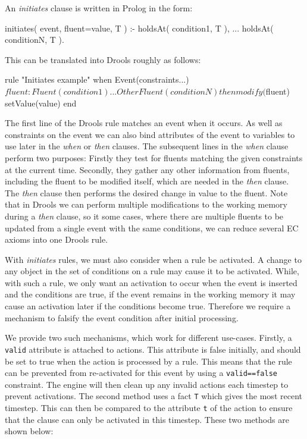 An \emph{initiates} clause is written in Prolog in the form:

\begin{prologinline}
initiates( event, fluent=value, T ) :-
	holdsAt( condition1, T ),
	...
	holdsAt( conditionN, T ).
\end{prologinline}

This can be translated into Drools roughly as follows:
\begin{droolsinline}
rule "Initiates example"
when
	Event(constraints...)
	$fluent : Fluent(condition1)
	...
	OtherFluent(conditionN)
then
	modify($fluent) {
		setValue(value)
	}
end
\end{droolsinline}

The first line of the Drools rule matches an event when it occurs. As well as
constraints on the event we can also bind attributes of the event to variables
to use later in the \emph{when} or \emph{then} clauses. The subsequent lines
in the \emph{when} clause perform two purposes: Firstly they test for fluents
matching the given constraints at the current time. Secondly, they gather any
other information from fluents, including the fluent to be modified itself,
which are needed in the \emph{then} clause. The \emph{then} clause then
performs the desired change in value to the fluent. Note that in Drools we can
perform multiple modifications to the working memory during a \emph{then}
clause, so it some cases, where there are multiple fluents to be updated from
a single event with the same conditions, we can reduce several \ac{EC} axioms
into one Drools rule.

With \emph{initiates} rules, we must also consider when a rule be activated. A
change to any object in the set of conditions on a rule may cause it to be
activated. While, with such a rule, we only want an activation to occur when the
event is inserted and the conditions are true, if the event remains in the
working memory it may cause an activation later if the conditions become true.
Therefore we require a mechanism to falsify the event condition after initial
processing.

We provide two such mechanisms, which work for different use-cases. Firstly, a
\texttt{valid} attribute is attached to actions. This attribute is false
initially, and should be set to true when the action is processed by a rule.
This means that the rule can be prevented from re-activated for this event by
using a \texttt{valid==false} constraint. The engine will then clean up any
invalid actions each timestep to prevent activations. The second method uses a
fact \texttt{T} which gives the most recent timestep. This can then be
compared to the attribute \texttt{t} of the action to ensure that the clause
can only be activated in this timestep. These two methods are shown below:

